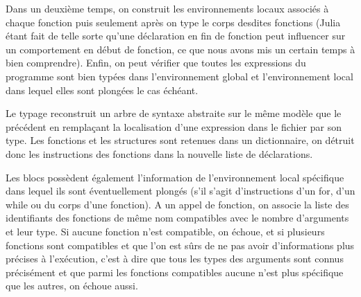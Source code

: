 \documentclass[10pt,a4paper]{article}
\begin{document}
Dans un deuxième temps, on construit les environnements locaux associés à chaque
fonction puis seulement après on type le corps desdites fonctions (Julia étant fait de
telle sorte qu'une déclaration en fin de fonction peut influencer sur un comportement
en début de fonction, ce que nous avons mis un certain temps à bien comprendre).
Enfin, on peut vérifier que toutes les expressions du programme sont bien typées dans
l'environnement global et l'environnement local dans lequel elles sont plongées le cas
échéant.
\newline

Le typage reconstruit un arbre de syntaxe abstraite sur le même modèle que le précédent en remplaçant la localisation d'une expression dans le fichier par son type. Les fonctions et les structures sont retenues dans un dictionnaire, on détruit donc les instructions des fonctions dans la nouvelle liste de déclarations. 

Les blocs possèdent également l'information de l'environnement local spécifique dans lequel ils sont éventuellement plongés (s'il s'agit d'instructions d'un for, d'un while ou du corps d'une fonction). A un appel de fonction, on associe la liste des identifiants des fonctions de même nom compatibles avec le nombre d'arguments et leur type. Si aucune fonction n'est compatible, on échoue, et si plusieurs fonctions sont compatibles et que l'on est sûrs de ne pas avoir d'informations plus précises à l'exécution, c'est à dire que tous les types des arguments sont connus précisément et que parmi les fonctions compatibles aucune n'est plus spécifique que les autres, on échoue aussi.
\end{document}
